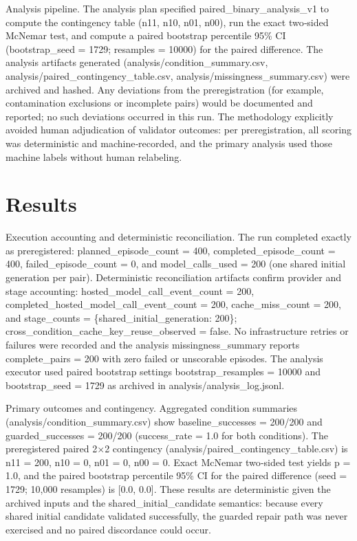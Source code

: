 \documentclass[conference]{IEEEtran}
\begin{document}
Analysis pipeline. The analysis plan specified paired\_binary\_analysis\_v1 to compute the contingency table (n11, n10, n01, n00), run the exact two‑sided McNemar test, and compute a paired bootstrap percentile 95\% CI (bootstrap\_seed = 1729; resamples = 10000) for the paired difference. The analysis artifacts generated (analysis/condition\_summary.csv, analysis/paired\_contingency\_table.csv, analysis/missingness\_summary.csv) were archived and hashed. Any deviations from the preregistration (for example, contamination exclusions or incomplete pairs) would be documented and reported; no such deviations occurred in this run. The methodology explicitly avoided human adjudication of validator outcomes: per preregistration, all scoring was deterministic and machine‑recorded, and the primary analysis used those machine labels without human relabeling.

\section{Results}
Execution accounting and deterministic reconciliation. The run completed exactly as preregistered: planned\_episode\_count = 400, completed\_episode\_count = 400, failed\_episode\_count = 0, and model\_calls\_used = 200 (one shared initial generation per pair). Deterministic reconciliation artifacts confirm provider and stage accounting: hosted\_model\_call\_event\_count = 200, completed\_hosted\_model\_call\_event\_count = 200, cache\_miss\_count = 200, and stage\_counts = \{shared\_initial\_generation: 200\}; cross\_condition\_cache\_key\_reuse\_observed = false. No infrastructure retries or failures were recorded and the analysis missingness\_summary reports complete\_pairs = 200 with zero failed or unscorable episodes. The analysis executor used paired bootstrap settings bootstrap\_resamples = 10000 and bootstrap\_seed = 1729 as archived in analysis/analysis\_log.jsonl.

Primary outcomes and contingency. Aggregated condition summaries (analysis/condition\_summary.csv) show baseline\_successes = 200/200 and guarded\_successes = 200/200 (success\_rate = 1.0 for both conditions). The preregistered paired 2\ensuremath{\times}2 contingency (analysis/paired\_contingency\_table.csv) is n11 = 200, n10 = 0, n01 = 0, n00 = 0. Exact McNemar two‑sided test yields p = 1.0, and the paired bootstrap percentile 95\% CI for the paired difference (seed = 1729; 10,000 resamples) is [0.0, 0.0]. These results are deterministic given the archived inputs and the shared\_initial\_candidate semantics: because every shared initial candidate validated successfully, the guarded repair path was never exercised and no paired discordance could occur.
\end{document}
